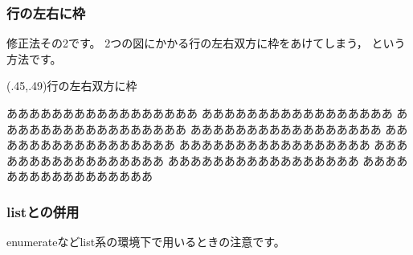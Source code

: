 \documentclass[fleqn,a4j]{jarticle}
\begin{document}
\subsubsection{行の左右に枠}
修正法その2です。
2つの図にかかる行の左右双方に枠をあけてしまう，
という方法です。

\begin{showEx}(.45,.49){行の左右双方に枠}
\begin{zuhaiti}
\end{zuhaiti}%
あああああああああああああああああ
あああああああああああああああああ
あああああああああああああああああ
あああああああああああああああああ
あああああああああああああああああ
あああああああああああああああああ
あああああああああああああああああ
あああああああああああああああああ
あああああああああああああああああ
\end{showEx}
\clearpage

\subsubsection{\textsf{list}との併用}
\textsf{enumerate}など\textsf{list}系の環境下で用いるときの注意です。
\end{document}
